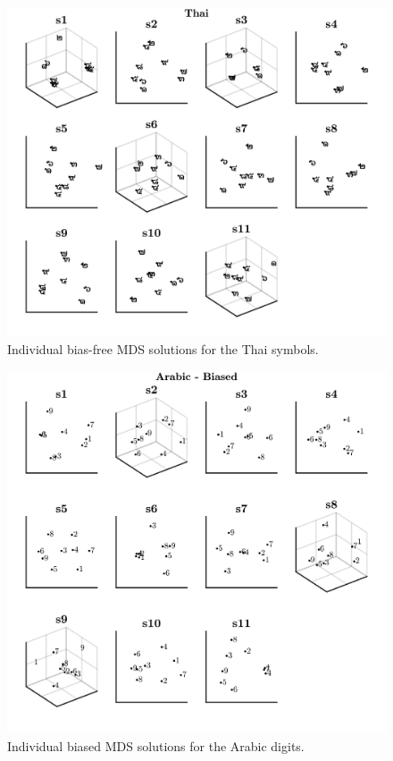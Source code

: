 \begin{figure}[tbh]
\centering \includegraphics[scale = .67]{Figures/Appendix/AppD/Indiv_MDS_4.jpg}
\caption{Individual bias-free MDS solutions for the Thai symbols.}
\label{fig:Apx_MDSthai}
\end{figure}



\begin{figure}[tbh]
\centering \includegraphics[scale = .67]{Figures/Appendix/AppD/Indiv_MDS_1_Biased.jpg}
\caption{Individual biased MDS solutions for the Arabic digits.}
\label{fig:Apx_MDSenglishBiased}
\end{figure}

